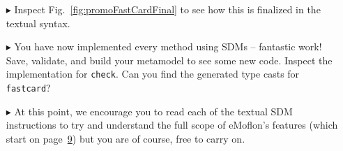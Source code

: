 \begin{itemize}
\vspace{0.5cm}

\item[$\blacktriangleright$] Inspect Fig.~\ref{fig:promoFastCardFinal} to see how this is finalized in the textual syntax.

\item[$\blacktriangleright$] You have now implemented every method using SDMs -- fantastic work! Save, validate, and build your metamodel to see some new code.
Inspect the implementation for \texttt{check}.  Can you find the generated type casts for \texttt{fastcard}?

\item[$\blacktriangleright$] At this point, we encourage you to read each of the textual SDM instructions to try and understand the full scope of eMoflon's
features (which start on page~\hyperlink{page.9}{9}) but you are of course, free to carry on.


\end{itemize}
